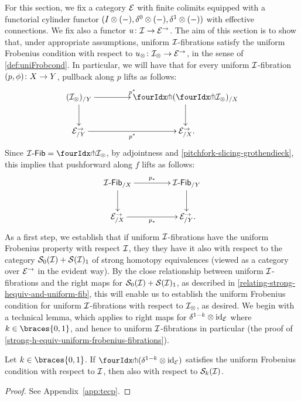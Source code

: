 \documentclass[reqno,10pt,a4paper,oneside,draft]{amsart}
\begin{document}
For this section, we fix a category $\catE$ with finite colimits equipped with a functorial cylinder functor $(\interval \otimes (-), \lcyl \otimes (-), \rcyl \otimes (-))$ with effective connections.
We fix also a functor $u \co \cal{I} \to \catE^\to$.
The aim of this section is to show that, under appropriate assumptions, uniform $\cal{I}$-fibrations satisfy the uniform Frobenius condition with respect to $u_\otimes \co \cal{I}_\otimes \to \cal{E}^\to$, in the sense of \cref{def:uniFrobcond}.
In particular, we will have that for every uniform $\cal{I}$-fibration $(p, \phi) \co X \to Y$, pullback along $p$ lifts as follows:
\[
\xymatrix@C+2em{
  (\cal{I}_\otimes)_{/Y}
  \ar[r]^{p^*}
  \ar[d]
&
  \liftl{(\liftr{\cal{I}_\otimes})}_{/X}
  \ar[d]
\\
  \cal{E}^\to_{/Y}
  \ar[r]_{p^*}
&
  \cal{E}^\to_{/X}
\rlap{.}}
\]
Since $\Fib{\cal{I}}  = \liftr{\cal{I}_\otimes}$, by adjointness and \cref{pitchfork-slicing-grothendieck}, this implies that pushforward along $f$ lifts as follows:
\[
\xymatrix@C+2em{
  \Fib{\cal{I}}_{/X}
  \ar[r]^{p_*}
  \ar[d]
&
  \Fib{\cal{I}}_{/Y}
  \ar[d]
\\
  \cal{E}^\to_{/X}
  \ar[r]_{p_*}
&
  \cal{E}^\to_{/Y}
\rlap{.}}
\]
As a first step, we establish that if uniform $\cal{I}$-fibrations have the uniform Frobenius property with respect $\cal{I}$, they they have it also with respect to the category $\cal{S}_0(\cal{I}) + \cal{S}(\cal{I})_1$ of strong homotopy equivalences (viewed as a category over $\cal{E}^\to$ in the evident way).
By the close relationship between uniform $\cal{I}$-fibrations and the right maps for $\cal{S}_0(\cal{I}) + \cal{S}(\cal{I})_1$, as described in \cref{relating-strong-hequiv-and-uniform-fib}, this will enable us to establish the uniform Frobenius condition for uniform $\cal{I}$-fibrations with respect to $\cal{I}_\otimes$, as desired.
We begin with a technical lemma, which applies to right maps for $\kcylinv \otimes \id_{\calE}$ where $k \in \braces{0, 1}$, and hence to uniform $\cal{I}$-fibrations in particular (\cf the proof of \cref{strong-h-equiv-uniform-frobenius-fibrations}).

\begin{lemma} \label{strong-h-equiv-uniform-frobenius}
Let $k \in \braces{0, 1}$.
If $\liftr{(\kcylinv \otimes \id_\catE)}$ satisfies the uniform Frobenius condition with respect to $\cal{I}$, then also with respect to $\cal{S}_k(\cal{I})$.
\end{lemma}

\begin{proof}
See Appendix~\ref{app:tecp}.
\end{proof}
\end{document}
